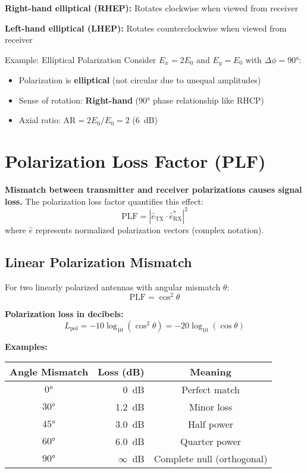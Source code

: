 \textbf{Right-hand elliptical (RHEP):} Rotates clockwise when viewed from receiver

\textbf{Left-hand elliptical (LHEP):} Rotates counterclockwise when viewed from receiver

\begin{calloutbox}{Example: Elliptical Polarization}
Consider $E_x = 2E_0$ and $E_y = E_0$ with $\Delta\phi = 90°$:
\begin{itemize}
\item Polarization is \textbf{elliptical} (not circular due to unequal amplitudes)
\item Sense of rotation: \textbf{Right-hand} ($90°$ phase relationship like RHCP)
\item Axial ratio: $\mathrm{AR} = 2E_0/E_0 = 2$ (6~dB)
\end{itemize}
\end{calloutbox}

\section{Polarization Loss Factor (PLF)}

\textbf{Mismatch between transmitter and receiver polarizations causes signal loss.} The polarization loss factor quantifies this effect:
\begin{equation}
\mathrm{PLF} = |\hat{e}_{\text{TX}} \cdot \hat{e}_{\text{RX}}^*|^2
\label{eq:plf}
\end{equation}
where $\hat{e}$ represents normalized polarization vectors (complex notation).

\subsection{Linear Polarization Mismatch}

For two linearly polarized antennas with angular mismatch $\theta$:
\begin{equation}
\mathrm{PLF} = \cos^2\theta
\label{eq:plf-linear}
\end{equation}

\textbf{Polarization loss in decibels:}
\begin{equation}
L_{\text{pol}} = -10\log_{10}(\cos^2\theta) = -20\log_{10}(\cos\theta)
\label{eq:pol-loss-db}
\end{equation}

\textbf{Examples:}

\begin{center}
\begin{tabular}{@{}crc@{}}
\toprule
\textbf{Angle Mismatch} & \textbf{Loss (dB)} & \textbf{Meaning} \\
\midrule
$0°$ & 0~dB & Perfect match \\
$30°$ & 1.2~dB & Minor loss \\
$45°$ & 3.0~dB & Half power \\
$60°$ & 6.0~dB & Quarter power \\
$90°$ & $\infty$~dB & Complete null (orthogonal) \\
\bottomrule
\end{tabular}
\end{center}

